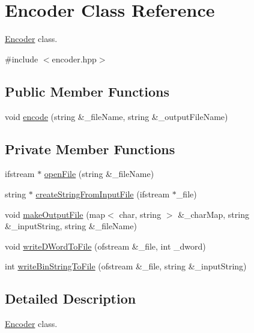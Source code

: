 \hypertarget{classEncoder}{}\section{Encoder Class Reference}
\label{classEncoder}


\hyperlink{classEncoder}{Encoder} class.  




{\ttfamily \#include $<$encoder.\+hpp$>$}

\subsection*{Public Member Functions}
\begin{DoxyCompactItemize}
\item 
void \hyperlink{classEncoder_a01393fbd422843fd26340c78131a7de7}{encode} (string \&\+\_\+file\+Name, string \&\+\_\+output\+File\+Name)
\end{DoxyCompactItemize}
\subsection*{Private Member Functions}
\begin{DoxyCompactItemize}
\item 
ifstream $\ast$ \hyperlink{classEncoder_a636e0312215ea7d297159101c61de855}{open\+File} (string \&\+\_\+file\+Name)
\item 
string $\ast$ \hyperlink{classEncoder_ac86366cbee284da597931ec2b1853dab}{create\+String\+From\+Input\+File} (ifstream $\ast$\+\_\+file)
\item 
void \hyperlink{classEncoder_a0fb288546159a003eb44df92e9c9e29d}{make\+Output\+File} (map$<$ char, string $>$ \&\+\_\+char\+Map, string \&\+\_\+input\+String, string \&\+\_\+file\+Name)
\item 
void \hyperlink{classEncoder_a860228d804c226ca40f4610a7e2a2907}{write\+D\+Word\+To\+File} (ofstream \&\+\_\+file, int \+\_\+dword)
\item 
int \hyperlink{classEncoder_a6a5575ce8c40c213abbcefd591c813c9}{write\+Bin\+String\+To\+File} (ofstream \&\+\_\+file, string \&\+\_\+input\+String)
\end{DoxyCompactItemize}


\subsection{Detailed Description}
\hyperlink{classEncoder}{Encoder} class. 

